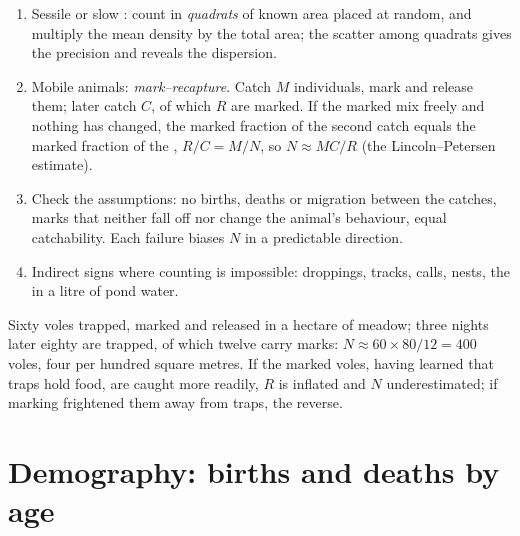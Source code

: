\begin{method}\label{met:b1:populations:counting}
\begin{enumerate}
  \item Sessile or slow : count in \emph{quadrats} of known
        area placed at random, and multiply the mean density by the
        total area; the scatter among quadrats gives the precision and
        reveals the dispersion.
  \item Mobile animals: \emph{mark--recapture}. Catch $M$
        individuals, mark and release them; later catch $C$, of which
        $R$ are marked. If the marked mix freely and nothing has
        changed, the marked fraction of the second catch equals the
        marked fraction of the , $R/C = M/N$, so
        $N \approx MC/R$ (the Lincoln--Petersen estimate).
  \item Check the assumptions: no births, deaths or migration between
        the catches, marks that neither fall off nor change the
        animal's behaviour, equal catchability. Each failure biases
        $N$ in a predictable direction.
  \item Indirect signs where counting is impossible: droppings,
        tracks, calls, nests, the  in a litre of pond water.
\end{enumerate}
\end{method}

\begin{example}\label{ex:b1:populations:voles}
Sixty voles trapped, marked and released in a hectare of meadow;
three nights later eighty are trapped, of which twelve carry marks:
$N \approx 60\times 80/12 = 400$ voles, four per hundred square metres.
If the marked voles, having learned that traps hold food, are caught
more readily, $R$ is inflated and $N$ underestimated; if marking
frightened them away from traps, the reverse.
\end{example}

\section{Demography: births and deaths by age}

